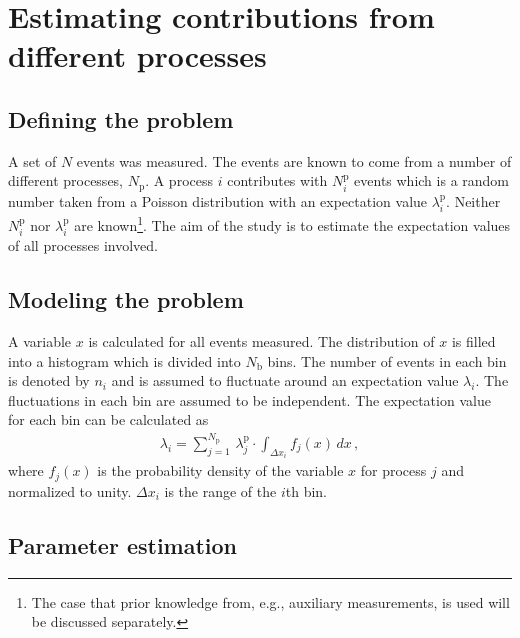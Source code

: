 \documentclass[11pt, a4paper]{article}
\begin{document}

\section{Estimating contributions from different processes}
\label{section:estimation}

\subsection{Defining the problem} 

A set of $N$ events was measured. The events are known to come from a
number of different processes, $N_{\mathrm{p}}$. A process $i$
contributes with $N_{i}^{\mathrm{p}}$ events which is a random number
taken from a Poisson distribution with an expectation value
$\lambda_{i}^{\mathrm{p}}$. Neither $N_{i}^{\mathrm{p}}$ nor
$\lambda_{i}^{\mathrm{p}}$ are known\footnote{The case that prior
knowledge from, e.g., auxiliary measurements, is used will be
discussed separately.}. The aim of the study is to estimate the
expectation values of all processes involved.

\subsection{Modeling the problem} 

A variable $x$ is calculated for all events measured. The distribution
of $x$ is filled into a histogram which is divided into
$N_{\mathrm{b}}$ bins. The number of events in each bin is denoted by
$n_{i}$ and is assumed to fluctuate around an expectation value
$\lambda_{i}$. The fluctuations in each bin are assumed to be
independent. The expectation value for each bin can be calculated as
%
\begin{eqnarray}
\lambda_{i} = \sum_{j=1}^{N_{\mathrm{p}}} \, \lambda_{j}^{\mathrm{p}} \cdot \int_{\Delta x_{i}} f_{j}(x) \, dx \, , 
\label{eqn:expectation}
\end{eqnarray}
%
where $f_{j}(x)$ is the probability density of the variable $x$ for
process $j$ and normalized to unity. $\Delta x_{i}$ is the range of
the $i$th bin.

\subsection{Parameter estimation} 
\end{document}
